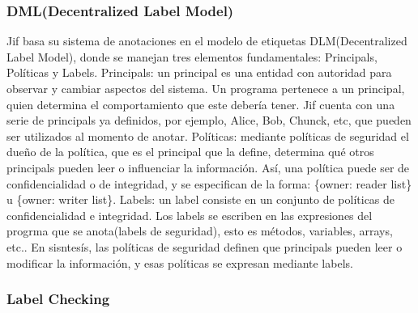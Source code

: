 \subsubsection{DML(Decentralized Label Model)}
Jif basa su sistema de anotaciones en el modelo de etiquetas DLM(Decentralized
Label Model), donde se manejan tres elementos fundamentales: Principals,
Políticas y Labels.\newline
Principals: un principal es una entidad con autoridad para observar y cambiar
aspectos del sistema. Un programa pertenece a un principal, quien determina el
comportamiento que este debería tener. Jif cuenta con una serie de principals ya
definidos, por ejemplo, Alice, Bob, Chunck, etc, que pueden ser
utilizados al momento de anotar.\newline 
Políticas: mediante políticas de seguridad el dueño de la política, que es el
principal que la define, determina qué otros principals pueden leer o
influenciar la información. Así, una política puede ser de confidencialidad o de
integridad, y se especifican de la forma: \{owner: reader list\} u
\{owner: writer list\}.\newline 
Labels: un label consiste en un conjunto de políticas de confidencialidad e
integridad. Los labels se escriben en las expresiones del progrma que se
anota(labels de seguridad), esto es métodos, variables, arrays, etc..\newline 
En sisntesís, las políticas de seguridad definen que principals pueden leer o
modificar la información, y esas políticas se expresan mediante labels.

\subsubsection{Label Checking}

